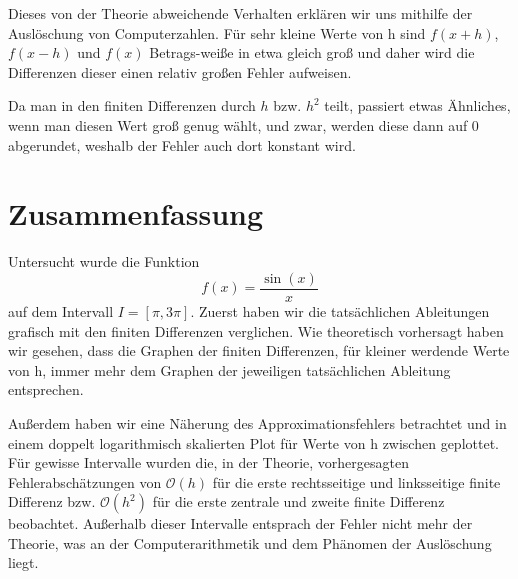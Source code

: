 \documentclass{scrartcl}
\newcommand{\BigO}{\mathcal{O}}
\theoremstyle{remark}
\begin{document}
Dieses von der Theorie abweichende Verhalten erklären wir uns mithilfe der
Auslöschung von Computerzahlen. Für sehr kleine Werte von h sind \(f(x + h)\),
\(f(x - h)\) und \(f(x)\) Betrags-weiße in etwa gleich groß und daher wird die
Differenzen dieser einen relativ großen Fehler aufweisen.

Da man in den finiten Differenzen durch \(h\) bzw. \(h^2\) teilt, passiert
etwas Ähnliches, wenn man diesen Wert groß genug wählt, und zwar, werden diese
dann auf 0 abgerundet, weshalb der Fehler auch dort konstant wird.

\section{Zusammenfassung}
Untersucht wurde die Funktion
\[
    f(x) = \frac{\sin(x)}{x}
\]
auf dem Intervall \(I = [\pi, 3\pi]\). Zuerst haben wir die tatsächlichen
  Ableitungen grafisch mit den finiten Differenzen verglichen. Wie theoretisch
  vorhersagt haben wir gesehen, dass die Graphen der finiten Differenzen, für
  kleiner werdende Werte von h, immer mehr dem Graphen der jeweiligen
  tatsächlichen Ableitung entsprechen.

Außerdem haben wir eine Näherung des Approximationsfehlers betrachtet und in
einem doppelt logarithmisch skalierten Plot für Werte von h zwischen
geplottet. Für gewisse Intervalle wurden die, in der Theorie, vorhergesagten
Fehlerabschätzungen von \(\BigO(h)\) für die erste rechtsseitige und
linksseitige finite Differenz bzw. \(\BigO(h^2)\) für die erste zentrale und
zweite finite Differenz beobachtet. Außerhalb dieser Intervalle entsprach der
Fehler nicht mehr der Theorie, was an der Computerarithmetik und dem Phänomen
der Auslöschung liegt.

\printbibliography
\end{document}
